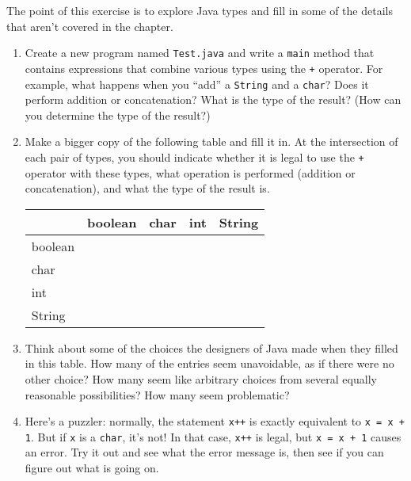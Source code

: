 \begin{exercise}

The point of this exercise is to explore Java types
and fill in some of the details that aren't covered
in the chapter.

\begin{enumerate}

\item Create a new program named {\tt Test.java} and write
a {\tt main} method that contains
expressions that combine
various types using the {\tt +} operator.  For example, what
happens when you ``add'' a {\tt String} and a {\tt char}?
Does it perform addition or concatenation?   What is the type
of the result? (How can you determine the type of the result?)

\item Make a bigger copy of the following table and fill it in.  At the
intersection of each pair of types, you should indicate whether it is
legal to use the {\tt +} operator with these types, what operation is
performed (addition or concatenation), and what the type of the result
is.

\begin{tabular}{|l|l|l|l|l|} \hline
        &  boolean  &  char  &  int  &  String \\ \hline
boolean &           &        &       &         \\ \hline
char    &           &        &       &         \\ \hline
int     &           &        &       &         \\ \hline
String  &           &        &       &         \\ \hline
\end{tabular}

\item Think about some of the choices the designers of Java
made when they filled in this table.  How many of the entries
seem unavoidable, as if there were no other choice?
How many seem like arbitrary choices from several equally
reasonable possibilities?  How many seem problematic?

\item Here's a puzzler: normally, the statement {\tt x++} is exactly
  equivalent to {\tt x = x + 1}.  But if {\tt x} is a {\tt char}, it's
  not!  In that case, {\tt x++} is legal, but {\tt x = x + 1} causes
  an error.  Try it out and see what the error message is, then see if
  you can figure out what is going on.

\end{enumerate}
\end{exercise}


